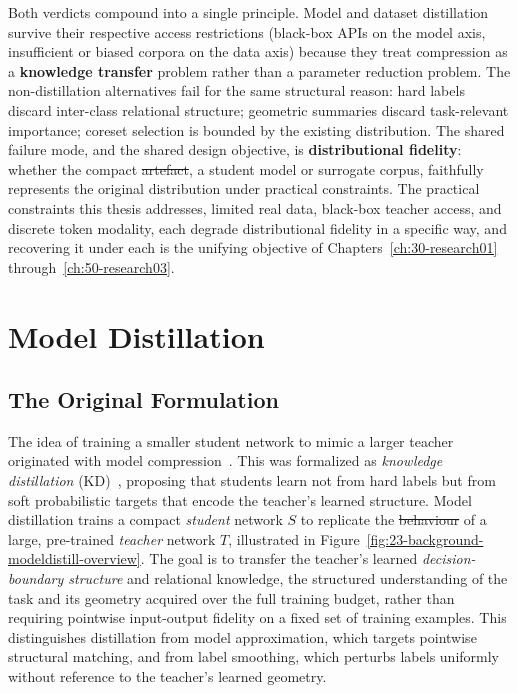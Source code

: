 \documentclass[12pt, a4paper, twoside]{book}
\makeatletter
\numberwithin{equation}{chapter}
\theoremstyle{plain}
\theoremstyle{definition}
\theoremstyle{remark}
\newenvironment{foldable}{}{}
\providecommand{\DIFaddtex}[1]{{\protect\color{blue}\uwave{#1}}} %
\providecommand{\DIFdeltex}[1]{{\protect\color{red}\sout{#1}}} %
\providecommand{\DIFaddbegin}{} %
\providecommand{\DIFaddend}{} %
\providecommand{\DIFdelbegin}{} %
\providecommand{\DIFdelend}{} %
\providecommand{\DIFadd}[1]{\texorpdfstring{\DIFaddtex{#1}}{#1}} %
\providecommand{\DIFdel}[1]{\texorpdfstring{\DIFdeltex{#1}}{}} %
\newcommand{\DIFscaledelfig}{0.5}
\newlength{\DIFdelgraphicswidth} %
\newlength{\DIFdelgraphicsheight} %
\newcommand{\DIFaddincludegraphics}[2][]{{\color{blue}\fbox{\DIFOincludegraphics[#1]{#2}}}} %
\newcommand{\DIFdelincludegraphics}[2][]{%
\sbox{\DIFdelgraphicsbox}{\DIFOincludegraphics[#1]{#2}}%
\settoboxwidth{\DIFdelgraphicswidth}{\DIFdelgraphicsbox} %
\settoboxtotalheight{\DIFdelgraphicsheight}{\DIFdelgraphicsbox} %
\scalebox{\DIFscaledelfig}{%
\parbox[b]{\DIFdelgraphicswidth}{\usebox{\DIFdelgraphicsbox}\\[-\baselineskip] \rule{\DIFdelgraphicswidth}{0em}}\llap{\resizebox{\DIFdelgraphicswidth}{\DIFdelgraphicsheight}{%
\setlength{\unitlength}{\DIFdelgraphicswidth}%
\begin{picture}(1,1)%
\thicklines\linethickness{2pt} %
{\color[rgb]{1,0,0}\put(0,0){\framebox(1,1){}}}%
{\color[rgb]{1,0,0}\put(0,0){\line( 1,1){1}}}%
{\color[rgb]{1,0,0}\put(0,1){\line(1,-1){1}}}%
\end{picture}%
}\hspace*{3pt}}} %
} %
\DeclareRobustCommand{\DIFaddbegin}{\DIFOaddbegin \let\includegraphics\DIFaddincludegraphics} %
\DeclareRobustCommand{\DIFaddend}{\DIFOaddend \let\includegraphics\DIFOincludegraphics} %
\DeclareRobustCommand{\DIFdelbegin}{\DIFOdelbegin \let\includegraphics\DIFdelincludegraphics} %
\DeclareRobustCommand{\DIFdelend}{\DIFOaddend \let\includegraphics\DIFOincludegraphics} %
\let\sout@orig\sout %
\renewcommand{\sout}[1]{\ifmmode\text{\sout@orig{\ensuremath{#1}}}\else\sout@orig{#1}\fi} %
\makeatother
\begin{document}
\begin{foldable}
  Both verdicts compound into a single principle.
  Model and dataset distillation survive their respective access restrictions (black-box \acp{API} on the model axis, insufficient or biased corpora on the data axis) because they treat compression as a \textbf{knowledge transfer} problem rather than a parameter reduction problem.
  The non-distillation alternatives fail for the same structural reason: hard labels discard inter-class relational structure; geometric summaries discard task-relevant importance; coreset selection is bounded by the existing distribution.
  The shared failure mode, and the shared design objective, is \textbf{distributional fidelity}: whether the compact \DIFdelbegin \DIFdel{artefact}\DIFdelend \DIFaddbegin \DIFadd{artifact}\DIFaddend , a student model or surrogate corpus, faithfully represents the original distribution under practical constraints.
  The practical constraints this thesis addresses, limited real data, black-box teacher access, and discrete token modality, each degrade distributional fidelity in a specific way, and recovering it under each is the unifying objective of Chapters~\ref{ch:30-research01} through~\ref{ch:50-research03}.
\end{foldable}
 \section{Model Distillation} \label{sec:23-background-modeldistill}
\subsection{The Original Formulation} \label{sec:23-background-modeldistill-hinton}
\begin{foldable}
  The idea of training a smaller student network to mimic a larger teacher originated with model compression~\cite{bucila2006model}.
  This was formalized as \textit{knowledge distillation} (\ac{KD})~\cite{hinton2015distilling}, proposing that students learn not from hard labels but from soft probabilistic targets that encode the teacher's learned structure.
  Model distillation trains a compact \textit{student} network $S$ to replicate the \DIFdelbegin \DIFdel{behaviour }\DIFdelend \DIFaddbegin \DIFadd{behavior }\DIFaddend of a large, pre-trained \textit{teacher} network $T$, illustrated in Figure~\ref{fig:23-background-modeldistill-overview}.
  The goal is to transfer the teacher's learned \textit{decision-boundary structure} and relational knowledge, the structured understanding of the task and its geometry acquired over the full training budget, rather than requiring pointwise input-output fidelity on a fixed set of training examples.
  This distinguishes distillation from model approximation, which targets pointwise structural matching, and from label smoothing, which perturbs labels uniformly without reference to the teacher's learned geometry.
\end{foldable}
\end{document}
